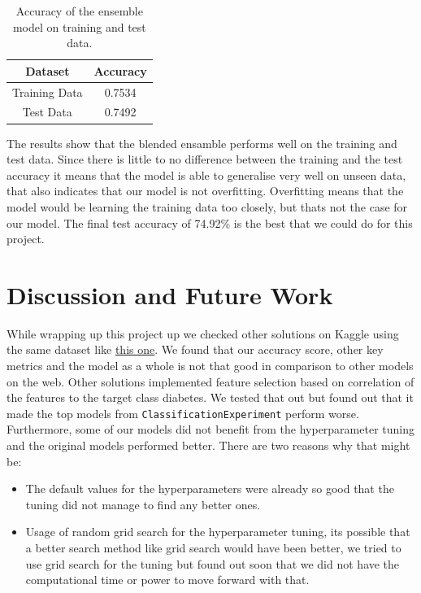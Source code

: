 \documentclass[a4paper,12pt]{article}
\begin{document}
\begin{table}[h]
    \centering
    \begin{tabular}{|c|c|}
        \hline
        \textbf{Dataset} & \textbf{Accuracy} \\
        \hline
        Training Data & 0.7534 \\
        Test Data & 0.7492 \\
        \hline
    \end{tabular}
    \caption{Accuracy of the ensemble model on training and test data.}
    \label{tab:accuracy_results}
\end{table}

The results show that the blended ensamble performs well on the training and test data. 
Since there is little to no difference between the training and the test accuracy it means that the model is able to generalise very well on unseen data, that also indicates that our model is not overfitting.
Overfitting means that the model would be learning the training data too closely, but thats not the case for our model.
The final test accuracy of 74.92\% is the best that we could do for this project.

\section{Discussion and Future Work}
While wrapping up this project up we checked other solutions on Kaggle using the same dataset like \href{https://www.kaggle.com/code/solafajobi/diabetes-perfect-prediction}{this one}.
We found that our accuracy score, other key metrics and the model as a whole is not that good in comparison to other models on the web.
Other solutions implemented feature selection based on correlation of the features to the target class diabetes. 
We tested that out but found out that it made the top models from \texttt{ClassificationExperiment} perform worse.
Furthermore, some of our models did not benefit from the hyperparameter tuning and the original models performed better.
There are two reasons why that might be:
    \begin{itemize}
        \item The default values for the hyperparameters were already so good that the tuning did not manage to find any better ones.
        \item Usage of random grid search for the hyperparameter tuning, its possible that a better search method like grid search would have been better, 
        we tried to use grid search for the tuning but found out soon that we did not have the computational time or power to move forward with that. 
    \end{itemize}
\end{document}
